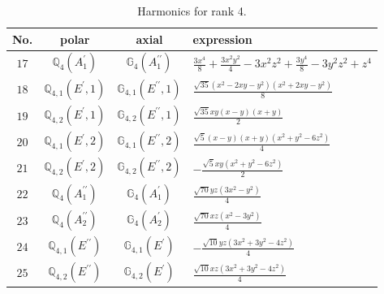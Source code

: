 \documentclass[fleqn,8pt,landscape]{jsarticle}
\begin{document}
\begin{table}[ht!]
\begin{center}
\caption{Harmonics for rank 4.}
\renewcommand{\arraystretch}{1.3}
\begin{tabular}{cccl} \hline \hline
No. & polar & axial & expression \\ \hline
$ 17 $ & $ \mathbb{Q}_{4}(A_{1}^{\prime}) $ & $ \mathbb{G}_{4}(A_{1}^{\prime\prime}) $ & $ \frac{3 x^{4}}{8} + \frac{3 x^{2} y^{2}}{4} - 3 x^{2} z^{2} + \frac{3 y^{4}}{8} - 3 y^{2} z^{2} + z^{4} $ \\
$ 18 $ & $ \mathbb{Q}_{4,1}(E^{\prime},1) $ & $ \mathbb{G}_{4,1}(E^{\prime\prime},1) $ & $ \frac{\sqrt{35} \left(x^{2} - 2 x y - y^{2}\right) \left(x^{2} + 2 x y - y^{2}\right)}{8} $ \\
$ 19 $ & $ \mathbb{Q}_{4,2}(E^{\prime},1) $ & $ \mathbb{G}_{4,2}(E^{\prime\prime},1) $ & $ \frac{\sqrt{35} x y \left(x - y\right) \left(x + y\right)}{2} $ \\
$ 20 $ & $ \mathbb{Q}_{4,1}(E^{\prime},2) $ & $ \mathbb{G}_{4,1}(E^{\prime\prime},2) $ & $ \frac{\sqrt{5} \left(x - y\right) \left(x + y\right) \left(x^{2} + y^{2} - 6 z^{2}\right)}{4} $ \\
$ 21 $ & $ \mathbb{Q}_{4,2}(E^{\prime},2) $ & $ \mathbb{G}_{4,2}(E^{\prime\prime},2) $ & $ - \frac{\sqrt{5} x y \left(x^{2} + y^{2} - 6 z^{2}\right)}{2} $ \\
$ 22 $ & $ \mathbb{Q}_{4}(A_{1}^{\prime\prime}) $ & $ \mathbb{G}_{4}(A_{1}^{\prime}) $ & $ \frac{\sqrt{70} y z \left(3 x^{2} - y^{2}\right)}{4} $ \\
$ 23 $ & $ \mathbb{Q}_{4}(A_{2}^{\prime\prime}) $ & $ \mathbb{G}_{4}(A_{2}^{\prime}) $ & $ \frac{\sqrt{70} x z \left(x^{2} - 3 y^{2}\right)}{4} $ \\
$ 24 $ & $ \mathbb{Q}_{4,1}(E^{\prime\prime}) $ & $ \mathbb{G}_{4,1}(E^{\prime}) $ & $ - \frac{\sqrt{10} y z \left(3 x^{2} + 3 y^{2} - 4 z^{2}\right)}{4} $ \\
$ 25 $ & $ \mathbb{Q}_{4,2}(E^{\prime\prime}) $ & $ \mathbb{G}_{4,2}(E^{\prime}) $ & $ \frac{\sqrt{10} x z \left(3 x^{2} + 3 y^{2} - 4 z^{2}\right)}{4} $ \\
 \hline \hline
\end{tabular}
\end{center}
\end{table}
\end{document}
